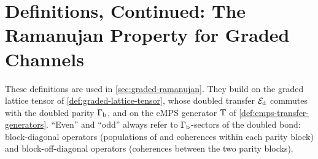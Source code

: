 
\section{Definitions, Continued: The Ramanujan Property for Graded Channels}
\label{sec:definitions-h}

These definitions are used in \cref{sec:graded-ramanujan}. They build on the graded lattice
tensor of \cref{def:graded-lattice-tensor}, whose doubled transfer $\mathcal E_{\mathrm d}$ commutes with the
doubled parity $\Gamma_{\mathrm b}$, and on the cMPS generator $\mathbb T$ of \cref{def:cmps-transfer-generators}.
``Even'' and ``odd'' always refer to $\Gamma_{\mathrm b}$-sectors of the doubled bond: block-diagonal
operators (populations of and coherences within each parity block) and block-off-diagonal
operators (coherences between the two parity blocks).

